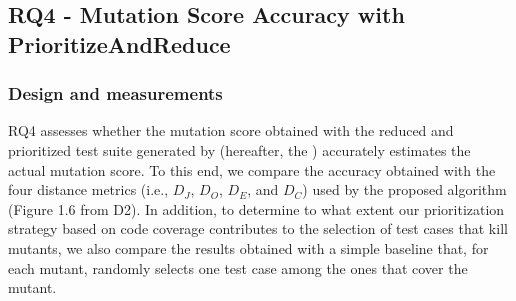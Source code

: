 %

%
%
%


\subsection{RQ4 - Mutation Score Accuracy with PrioritizeAndReduce}
\label{exp:accuracy:prioritize}

\subsubsection{Design and measurements}

RQ4 assesses whether the mutation score obtained with the reduced and prioritized test suite generated by \APPR (hereafter, the \MPTS) accurately estimates the actual mutation  score.
To this end, we compare the accuracy obtained with the four distance metrics (i.e., $D_J$, $D_O$, $D_E$, and $D_C$) used by the proposed  algorithm (Figure 1.6 from D2). In addition, to determine to what extent our prioritization strategy based on code coverage contributes to the selection of test cases that kill mutants, we also compare the results obtained with a simple baseline that, for each mutant, randomly selects one test case among the ones that cover the mutant. 


